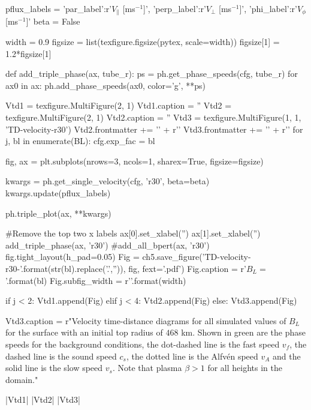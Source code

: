 \begin{pycode}[chapter5]
pflux_labels = {'par_label':r'$V_\parallel$ [ms$^{-1}$]', 
                'perp_label':r'$V_\perp$ [ms$^{-1}$]',
                'phi_label':r'$V_\phi$ [ms$^{-1}$]'}
beta = False

width = 0.9
figsize = list(texfigure.figsize(pytex, scale=width))
figsize[1] = 1.2*figsize[1]

def add_triple_phase(ax, tube_r):
    ps = ph.get_phase_speeds(cfg, tube_r)
    for ax0 in ax:
        ph.add_phase_speeds(ax0, color='g', **ps)
    
Vtd1 = texfigure.MultiFigure(2, 1)
Vtd1.caption = ''
Vtd2 = texfigure.MultiFigure(2, 1)
Vtd2.caption = ''
Vtd3 = texfigure.MultiFigure(1, 1, 'TD-velocity-r30')
Vtd2.frontmatter += '\n' + r'\ContinuedFloat'
Vtd3.frontmatter += '\n' + r'\ContinuedFloat'
for j, bl in enumerate(BL):
    cfg.exp_fac = bl
    
    fig, ax = plt.subplots(nrows=3, ncols=1, sharex=True, figsize=figsize)
    
    kwargs = ph.get_single_velocity(cfg, 'r30', beta=beta)
    kwargs.update(pflux_labels)
    
    ph.triple_plot(ax, **kwargs)
    
    #Remove the top two x labels
    ax[0].set_xlabel('')
    ax[1].set_xlabel('')
    add_triple_phase(ax, 'r30')
    #add_all_bpert(ax, 'r30')
    fig.tight_layout(h_pad=0.05)
    Fig = ch5.save_figure('TD-velocity-r30-{}'.format(str(bl).replace('.','')), fig, fext='.pdf')
    Fig.caption = r'$B_L = {}$'.format(bl)
    Fig.subfig_width = r'{}\columnwidth'.format(width)

    if j < 2:
        Vtd1.append(Fig)
    elif j < 4:
        Vtd2.append(Fig)
    else:
        Vtd3.append(Fig)

Vtd3.caption = r"Velocity time-distance diagrams for all simulated values of $B_L$ for the surface with an initial top radius of $468$ km. Shown in green are the phase speeds for the background conditions, the dot-dashed line is the fast speed $v_f$, the dashed line is the sound speed $c_s$, the dotted line is the Alfv\'en speed $v_A$ and the solid line is the slow speed $v_s$. Note that plasma $\beta > 1$ for all heights in the domain."

\end{pycode}

\py[chapter5]|Vtd1|
\py[chapter5]|Vtd2|
\py[chapter5]|Vtd3|


